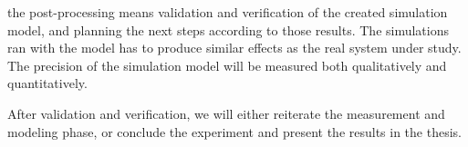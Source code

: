 the post-processing means validation and verification of the created simulation model, and planning the next steps according to those results. The simulations ran with the model has to produce similar effects as the real system under study. The precision of the simulation model will be measured both qualitatively and quantitatively.

After validation and verification, we will either reiterate the measurement and modeling phase, or conclude the experiment and present the results in the thesis.

